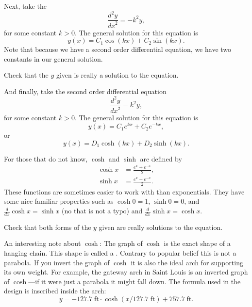 Next, take the
\emph{}
\begin{equation*}
\frac{d^2y}{{dx}^2} = -k^2 y ,
\end{equation*}
for some constant $k > 0$.
The general solution for this equation is
\begin{equation*}
y(x) = C_1 \cos(kx) + C_2 \sin(kx) .
\end{equation*}
Note that
because
we have a second order differential equation,
we have two constants in our general solution.

\begin{exercise}
Check that the $y$ given is really a solution to the equation.
\end{exercise}

And finally, take the second order differential equation
\begin{equation*}
\frac{d^2y}{{dx}^2} = k^2 y ,
\end{equation*}
for some constant $k > 0$.
The general solution for this equation is
\begin{equation*}
y(x) = C_1 e^{kx} + C_2 e^{-kx} ,
\end{equation*}
or
\begin{equation*}
y(x) = D_1 \cosh(kx) + D_2 \sinh(kx) .
\end{equation*}

For those that do not know, $\cosh$ and $\sinh$ are defined by
\begin{align*}
\cosh x &= \frac{e^{x} + e^{-x}}{2} , \\
\sinh x &= \frac{e^{x} - e^{-x}}{2} .
\end{align*}
These functions are sometimes easier to
work with than exponentials.  They have some nice familiar
properties such as
$\cosh 0 = 1$, $\sinh 0 = 0$, and $\frac{d}{dx} \cosh x = \sinh x$ (no that is
not a typo)
and $\frac{d}{dx} \sinh x = \cosh x$.

\begin{exercise}
Check that both forms of the $y$ given are
really solutions to the equation.
\end{exercise}

An interesting note about $\cosh$:  The graph of $\cosh$ is the exact shape
of a hanging chain.  This shape is called
a \emph{}.
Contrary to popular belief this is not a
parabola.  If you invert the graph of $\cosh$ it is also the ideal arch for
supporting its own weight.
For example, the gateway arch in Saint Louis is an inverted graph of
$\cosh$---if it were just a parabola it might fall down.  The formula
used in the design is
inscribed inside the arch:
\begin{equation*}
y = -127.7 \; \textrm{ft} \cdot \cosh({x / 127.7  \; \textrm{ft}}) + 757.7 \;
\textrm{ft} .
\end{equation*}



